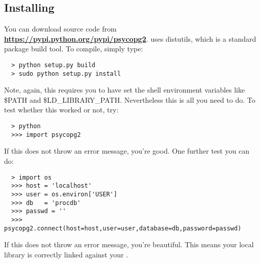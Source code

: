 \subsection{Installing {\psycopg}}

You can download {\psycopg} source code from 
\href{https://pypi.python.org/pypi/psycopg2}{\color{blue}\bf https://pypi.python.org/pypi/psycopg2}.
{} uses {\ttfamily distutils}, which is a standard {\python} package build tool.
To compile, simply type:
\begin{lstlisting}
  > python setup.py build
  > sudo python setup.py install
\end{lstlisting}
Note, again, this requires you to have set the shell environment variables like {\ttfamily \$PATH}
and {\ttfamily \$LD\_LIBRARY\_PATH}. Nevertheless this is all you need to do. To test whether this
worked or not, try:
\begin{lstlisting}
  > python
  >>> import psycopg2
\end{lstlisting}
If this does not throw an error message, you're good. One further test you can do:
\begin{lstlisting}
  > import os
  >>> host = 'localhost'
  >>> user = os.environ['USER']
  >>> db   = 'procdb'
  >>> passwd = ''
  >>> psycopg2.connect(host=host,user=user,database=db,password=passwd)
\end{lstlisting}
If this does not throw an error message, you're beautiful. This means your local {\psycopg}
library is correctly linked against your {\psql}.

